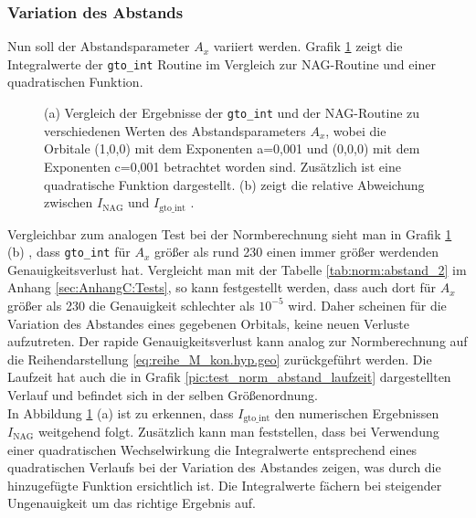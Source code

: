 \subsubsection{Variation des Abstands}
%
Nun soll der Abstandsparameter $A_x$ variiert werden. Grafik 
\ref{pic:quad.WW_Abstand} zeigt die Integralwerte der \texttt{gto\_int} Routine 
im 
Vergleich zur NAG-Routine und einer quadratischen Funktion.
%
\begin{figure}[H] \centering
	\caption{(a) Vergleich der Ergebnisse der \texttt{gto\_int} und der 
	NAG-Routine zu 
	verschiedenen Werten des Abstandsparameters $A_x$, wobei die Orbitale 
	(1,0,0) mit dem Exponenten a=0,001 und (0,0,0) mit dem Exponenten c=0,001 
	betrachtet worden sind. 	Zusätzlich ist eine quadratische Funktion 
	dargestellt. 
	(b)  zeigt die relative Abweichung zwischen $I_\text{NAG}$ und 
	$I_\text{gto\_int}$ .  } 
	\label{pic:quad.WW_Abstand}
\end{figure}
%
Vergleichbar zum analogen Test bei der Normberechnung sieht man in Grafik 
\ref{pic:quad.WW_Abstand} (b) , dass \texttt{gto\_int} für $A_x$ größer als 
rund 
230 einen immer größer werdenden Genauigkeitsverlust hat. Vergleicht man mit 
der 
Tabelle \ref{tab:norm:abstand_2} im Anhang \ref{sec:AnhangC:Tests}, so kann  
festgestellt werden, dass auch dort für $A_x$ größer als 230 die Genauigkeit 
schlechter als $10^{-5}$ wird. Daher scheinen für die Variation des Abstandes 
eines gegebenen Orbitals, keine neuen Verluste aufzutreten. Der rapide 
Genauigkeitsverlust kann analog zur Normberechnung auf die Reihendarstellung 
\ref{eq:reihe_M_kon.hyp.geo} zurückgeführt werden. Die Laufzeit hat auch die in 
Grafik \ref{pic:test_norm_abstand_laufzeit} dargestellten Verlauf und befindet 
sich in der selben Größenordnung. \\
In Abbildung \ref{pic:quad.WW_Abstand} (a) ist zu erkennen, dass 
$I_\text{gto\_int}$ den numerischen Ergebnissen $I_\text{NAG}$ weitgehend 
folgt. Zusätzlich kann man feststellen, dass bei Verwendung einer quadratischen 
Wechselwirkung die Integralwerte entsprechend eines quadratischen Verlaufs bei 
der Variation des Abstandes zeigen, was durch die hinzugefügte Funktion 
ersichtlich ist. Die Integralwerte fächern bei steigender Ungenauigkeit um das 
richtige Ergebnis auf.    
%
%
%
